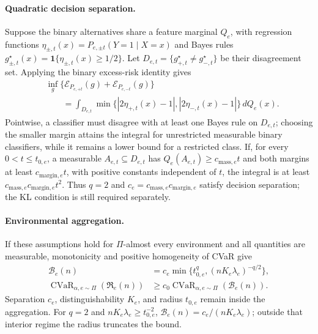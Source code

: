 \paragraph{Quadratic decision separation.}
Suppose the binary alternatives share a feature marginal $Q_e$, with regression functions $\eta_{\pm,t}(x)=P_{e,\pm t}(Y=1\mid X=x)$ and Bayes rules $g_{\pm,t}^\star(x)=\mathbf1\{\eta_{\pm,t}(x)\ge1/2\}$. Let $D_{e,t}=\{g_{+,t}^\star\ne g_{-,t}^\star\}$ be their disagreement set. Applying the binary excess-risk identity \citep[Eq.~(1.1)]{audibert2007fast} gives
\begin{equation}
\begin{aligned}
&\inf_g\{\mathcal E_{P_{e,+t}}(g)+\mathcal E_{P_{e,-t}}(g)\}\\
&\qquad=\int_{D_{e,t}}\min\{|2\eta_{+,t}(x)-1|,|2\eta_{-,t}(x)-1|\}\,dQ_e(x).
\end{aligned}
\label{eq:app-boundary-separation}
\end{equation}
Pointwise, a classifier must disagree with at least one Bayes rule on $D_{e,t}$; choosing the smaller margin attains the integral for unrestricted measurable binary classifiers, while it remains a lower bound for a restricted class. If, for every $0<t\le t_{0,e}$, a measurable $A_{e,t}\subseteq D_{e,t}$ has $Q_e(A_{e,t})\ge c_{\mathrm{mass},e}t$ and both margins at least $c_{\mathrm{margin},e}t$, with positive constants independent of $t$, the integral is at least $c_{\mathrm{mass},e}c_{\mathrm{margin},e}t^2$. Thus $q=2$ and $c_e=c_{\mathrm{mass},e}c_{\mathrm{margin},e}$ satisfy decision separation; the KL condition is still required separately.

\paragraph{Environmental aggregation.}
If these assumptions hold for $\Pi$-almost every environment and all quantities are measurable, monotonicity and positive homogeneity of CVaR give
\begin{equation}
\begin{aligned}
\mathcal B_e(n)&=c_e\min\{t_{0,e}^{q},(nK_e\lambda_e)^{-q/2}\},\\
\operatorname{CVaR}_{\alpha,e\sim\Pi}(\mathfrak R_e(n))
&\ge c_0\operatorname{CVaR}_{\alpha,e\sim\Pi}(\mathcal B_e(n)).
\end{aligned}
\label{eq:app-tail-risk-aggregation}
\end{equation}
Separation $c_e$, distinguishability $K_e$, and radius $t_{0,e}$ remain inside the aggregation. For $q=2$ and $nK_e\lambda_e\ge t_{0,e}^{-2}$, $\mathcal B_e(n)=c_e/(nK_e\lambda_e)$; outside that interior regime the radius truncates the bound.

